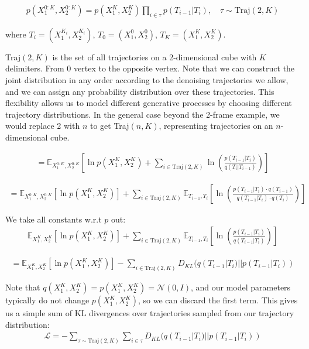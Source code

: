 \documentclass[11pt]{article}
\begin{document}
\begin{align}
p(X_1^{0:K}, X_2^{0:K}) = p(X_1^K, X_2^K) \prod_{i \in \tau} p(T_{i-1} | T_i), \quad \tau \sim \text{Traj}(2,K)
\end{align}

where $T_i = (X_1^{K_i}, X_2^{K_i})$, $T_0 = (X_1^0, X_2^0)$, $T_K = (X_1^K, X_2^K)$.

Traj$(2, K)$ is the set of all trajectories on a 2-dimensional cube with $K$ delimiters. From 0 vertex to the opposite vertex. Note that we can construct the joint distribution in any order according to the denoising trajectories we allow, and we can assign any probability distribution over these trajectories. This flexibility allows us to model different generative processes by choosing different trajectory distributions. In the general case beyond the 2-frame example, we would replace 2 with $n$ to get Traj$(n, K)$, representing trajectories on an $n$-dimensional cube.

\begin{align}
= \mathbb{E}_{X_1^{0:K}, X_2^{0:K}} \left[ \ln p(X_1^K, X_2^K) + \sum_{i \in \text{Traj}(2,K)} \ln \left( \frac{p(T_{i-1} | T_i)}{q(T_i | T_{i-1})} \right) \right]
\end{align}

\begin{align}
= \mathbb{E}_{X_1^{0:K}, X_2^{0:K}} \left[ \ln p(X_1^K, X_2^K) \right] + \sum_{i \in \text{Traj}(2,K)} \mathbb{E}_{T_{i-1}, T_i} \left[ \ln \left( \frac{p(T_{i-1} | T_i) \cdot q(T_{i-1})}{q(T_{i-1} | T_i) \cdot q(T_i)} \right) \right]
\end{align}

We take all constants w.r.t $p$ out:
\begin{align}
\mathbb{E}_{X_1^K, X_2^K} \left[ \ln p(X_1^K, X_2^K) \right] + \sum_{i \in \text{Traj}(2,K)} \mathbb{E}_{T_{i-1}, T_i} \left[ \ln \left( \frac{p(T_{i-1} | T_i)}{q(T_{i-1} | T_i)} \right) \right]
\end{align}

\begin{align}
= \mathbb{E}_{X_1^K, X_2^K} \left[ \ln p(X_1^K, X_2^K) \right] - \sum_{i \in \text{Traj}(2,K)} D_{KL}(q(T_{i-1} | T_i) || p(T_{i-1} | T_i))
\end{align}

Note that $q(X_1^K, X_2^K) = p(X_1^K, X_2^K) = \mathcal{N}(0, I)$, and our model parameters typically do not change $p(X_1^K, X_2^K)$, so we can discard the first term. This gives us a simple sum of KL divergences over trajectories sampled from our trajectory distribution:
\begin{align}
\mathcal{L} = -\sum_{\tau \sim \text{Traj}(2,K)} \sum_{i \in \tau} D_{KL}(q(T_{i-1} | T_i) || p(T_{i-1} | T_i))
\end{align}
\end{document}
